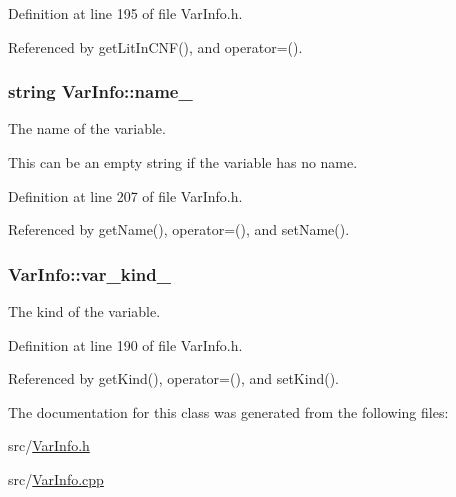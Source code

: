 Definition at line 195 of file Var\-Info.\-h.



Referenced by get\-Lit\-In\-C\-N\-F(), and operator=().

\hypertarget{classVarInfo_a82a85d0c811c2e5501401bd42463371b}{
\subsubsection[{name\-\_\-}]{\setlength{\rightskip}{0pt plus 5cm}string Var\-Info\-::name\-\_\-\hspace{0.3cm}{\ttfamily [protected]}}}\label{classVarInfo_a82a85d0c811c2e5501401bd42463371b}


The name of the variable. 

This can be an empty string if the variable has no name. 

Definition at line 207 of file Var\-Info.\-h.



Referenced by get\-Name(), operator=(), and set\-Name().

\hypertarget{classVarInfo_aabed2d542c10abb83514e4592913b431}{
\subsubsection[{var\-\_\-kind\-\_\-}]{ Var\-Info\-::var\-\_\-kind\-\_\-\hspace{0.3cm}{\ttfamily [protected]}}}\label{classVarInfo_aabed2d542c10abb83514e4592913b431}


The kind of the variable. 



Definition at line 190 of file Var\-Info.\-h.



Referenced by get\-Kind(), operator=(), and set\-Kind().



The documentation for this class was generated from the following files\-:\begin{DoxyCompactItemize}
\item 
src/\hyperlink{VarInfo_8h}{Var\-Info.\-h}\item 
src/\hyperlink{VarInfo_8cpp}{Var\-Info.\-cpp}\end{DoxyCompactItemize}
